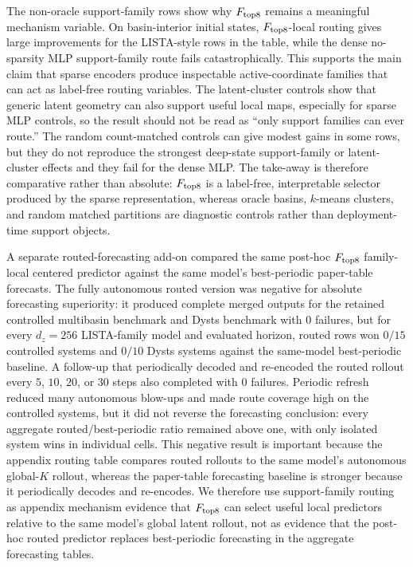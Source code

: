 The non-oracle support-family rows show why \(F_{\rm top8}\) remains a meaningful mechanism variable. On basin-interior initial states, \(F_{\rm top8}\)-local routing gives large improvements for the LISTA-style rows in the table, while the dense no-sparsity MLP support-family route fails catastrophically. This supports the main claim that sparse encoders produce inspectable active-coordinate families that can act as label-free routing variables. The latent-cluster controls show that generic latent geometry can also support useful local maps, especially for sparse MLP controls, so the result should not be read as ``only support families can ever route.'' The random count-matched controls can give modest gains in some rows, but they do not reproduce the strongest deep-state support-family or latent-cluster effects and they fail for the dense MLP. The take-away is therefore comparative rather than absolute: \(F_{\rm top8}\) is a label-free, interpretable selector produced by the sparse representation, whereas oracle basins, \(k\)-means clusters, and random matched partitions are diagnostic controls rather than deployment-time support objects.

A separate routed-forecasting add-on compared the same post-hoc \(F_{\rm top8}\) family-local centered predictor against the same model's best-periodic paper-table forecasts. The fully autonomous routed version was negative for absolute forecasting superiority: it produced complete merged outputs for the retained controlled multibasin benchmark and Dysts benchmark with \(0\) failures, but for every \(d_z=256\) LISTA-family model and evaluated horizon, routed rows won \(0/15\) controlled systems and \(0/10\) Dysts systems against the same-model best-periodic baseline. A follow-up that periodically decoded and re-encoded the routed rollout every \(5\), \(10\), \(20\), or \(30\) steps also completed with \(0\) failures. Periodic refresh reduced many autonomous blow-ups and made route coverage high on the controlled systems, but it did not reverse the forecasting conclusion: every aggregate routed/best-periodic ratio remained above one, with only isolated system wins in individual cells. This negative result is important because the appendix routing table compares routed rollouts to the same model's autonomous global-\(K\) rollout, whereas the paper-table forecasting baseline is stronger because it periodically decodes and re-encodes. We therefore use support-family routing as appendix mechanism evidence that \(F_{\rm top8}\) can select useful local predictors relative to the same model's global latent rollout, not as evidence that the post-hoc routed predictor replaces best-periodic forecasting in the aggregate forecasting tables.
